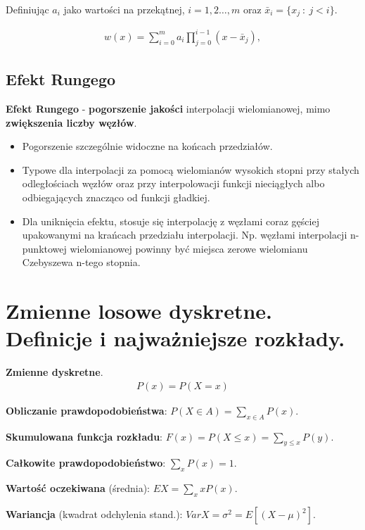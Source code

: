\documentclass[main.tex]{subfiles}
\begin{document}
    Definiując $a_{i}$ jako wartości na przekątnej, $i=1,2 \dots ,m$ oraz $\bar {x}_{i} = \{x_j ~ : ~ j < i\}$.

    \begin{align*}
        w(x)=\sum _{i=0}^{m}a_{i}\prod _{j=0}^{i-1}(x-{\bar {x}}_{j}),
    \end{align*}


    \subsection{Efekt Rungego}

    \textbf{Efekt Rungego} - \textbf{pogorszenie jakości} interpolacji wielomianowej, mimo \textbf{zwiększenia liczby
    węzłów}.
    \begin{itemize}
        \item Pogorszenie szczególnie widoczne na końcach przedziałów.
        \item Typowe dla interpolacji za pomocą wielomianów wysokich stopni przy stałych odległościach węzłów oraz przy
        interpolowacji funkcji nieciągłych albo odbiegających znacząco od funkcji gładkiej.
        \item Dla uniknięcia efektu, stosuje się interpolację z węzłami coraz gęściej upakowanymi na krańcach przedziału
        interpolacji. Np. węzłami interpolacji n-punktowej wielomianowej powinny być miejsca zerowe wielomianu Czebyszewa
        n-tego stopnia.

    \end{itemize}

    \newpage


    \section{Zmienne losowe dyskretne. Definicje i najważniejsze rozkłady.}

    \begin{definition}
        \textbf{Zmienne dyskretne}.
        \begin{align*}
            P(x) = P(X=x)
        \end{align*}

        \textbf{Obliczanie prawdopodobieństwa}: $P(X \in A) = \sum_{x \in A} P(x)$.


        \textbf{Skumulowana funkcja rozkładu}: $F(x) = P(X \leq x) = \sum_{y \leq x}P(y)$.

        \textbf{Całkowite prawdopodobieństwo}: $\sum_{x}P(x) = 1$.

        \textbf{Wartość oczekiwana} (średnia): $EX = \sum_{x} x P(x)$.

        \textbf{Wariancja} (kwadrat odchylenia stand.): $VarX = \sigma^2 = E[ (X - \mu)^2 ]$.
    \end{definition}
\end{document}
